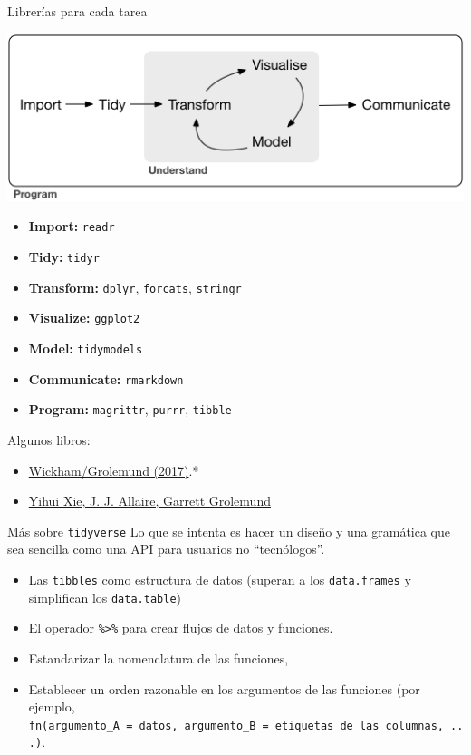 \documentclass[
  ignorenonframetext,
  aspectratio=169]{beamer}
\providecommand{\tightlist}{%
  \setlength{\itemsep}{0pt}\setlength{\parskip}{0pt}}
\begin{document}
\begin{frame}[fragile]{Librerías para cada tarea}
\label{libreruxedas-para-cada-tarea}
\begin{center}\includegraphics[width=0.3\linewidth]{Imgs/data-science} \end{center}

\begin{itemize}
\tightlist
\item
  \textbf{Import:} \texttt{readr}\\
\item
  \textbf{Tidy:} \texttt{tidyr}\\
\item
  \textbf{Transform:} \texttt{dplyr}, \texttt{forcats},
  \texttt{stringr}\\
\item
  \textbf{Visualize:} \texttt{ggplot2}\\
\item
  \textbf{Model:} \texttt{tidymodels}\\
\item
  \textbf{Communicate:} \texttt{rmarkdown}\\
\item
  \textbf{Program:} \texttt{magrittr}, \texttt{purrr}, \texttt{tibble}
\end{itemize}

Algunos libros:

\begin{itemize}
\tightlist
\item
  \href{https://r4ds.had.co.nz/tidy-data.html}{Wickham/Grolemund
  (2017)}.*
\item
  \href{https://bookdown.org/yihui/rmarkdown/}{Yihui Xie, J. J. Allaire,
  Garrett Grolemund}
\end{itemize}
\end{frame}

\begin{frame}[fragile]{Más sobre \texttt{tidyverse}}
\label{muxe1s-sobre-tidyverse-1}
Lo que se intenta es hacer un diseño y una gramática que sea sencilla
como una API para usuarios no ``tecnólogos''.

\begin{itemize}
\item
  Las \texttt{tibbles} como estructura de datos (superan a los
  \texttt{data.frames} y simplifican los \texttt{data.table})
\item
  El operador \texttt{\%\textgreater{}\%} para crear flujos de datos y
  funciones.
\item
  Estandarizar la nomenclatura de las funciones,
\item
  Establecer un orden razonable en los argumentos de las funciones (por
  ejemplo,
  \texttt{fn(argumento\_A\ =\ datos,\ argumento\_B\ =\ etiquetas\ de\ las\ columnas,\ ...)}.
\end{itemize}
\end{frame}
\end{document}
